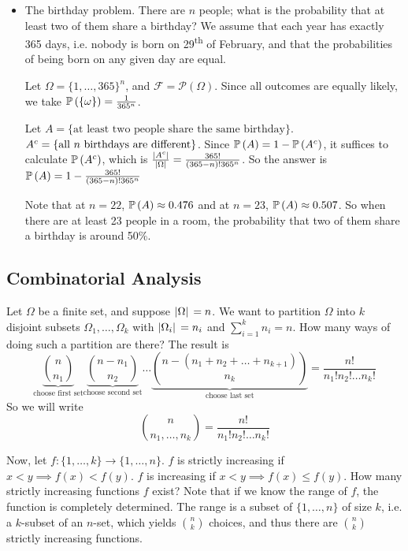 \documentclass{article}
\begin{document}
\begin{itemize}
    \item The birthday problem. There are $n$ people; what is the probability that at least two of them share a birthday? We assume that each year has exactly 365 days, i.e. nobody is born on 29\textsuperscript{th} of February, and that the probabilities of being born on any given day are equal.

          Let $\Omega = \{1, \dots, 365\}^n$, and $\mathcal F = \mathcal P(\Omega)$. Since all outcomes are equally likely, we take $\mathbb{P}\left({\{\omega\}}\right) = \frac{1}{365^n}$.

          Let $A = \{ \text{at least two people share the same birthday} \}$. ${A}^c = \{ \text{all } n \text{ birthdays are different} \}$. Since $\mathbb{P}\left({A}\right) = 1 - \mathbb{P}\left({{A}^c}\right)$, it suffices to calculate $\mathbb{P}\left({{A}^c}\right)$, which is $\frac{\abs*{{A}^c}}{\abs*{\Omega}} = \frac{365!}{(365 - n)!365^n}$. So the answer is $\mathbb{P}\left({A}\right) = 1 - \frac{365!}{(365 - n)!365^n}$

          Note that at $n=22$, $\mathbb{P}\left({A}\right) \approx 0.476$ and at $n=23$, $\mathbb{P}\left({A}\right) \approx 0.507$. So when there are at least 23 people in a room, the probability that two of them share a birthday is around 50\%.
\end{itemize}

\subsection{Combinatorial Analysis}
Let $\Omega$ be a finite set, and suppose $\abs*{\Omega} = n$. We want to partition $\Omega$ into $k$ disjoint subsets $\Omega_1, \dots, \Omega_k$ with $\abs*{\Omega_i} = n_i$ and $\sum_{i=1}^k n_i = n$. How many ways of doing such a partition are there? The result is
\[ \underbrace{\binom{n}{n_1}}_{\text{choose first set}}\underbrace{\binom{n-n_1}{n_2}}_{\text{choose second set}}\dots\underbrace{\binom{n-(n_1 + n_2 + \dots + n_{k+1})}{n_k}}_{\text{choose last set}} = \frac{n!}{n_1!n_2!\dots n_k!} \]
So we will write
\[ \binom{n}{n_1, \dots, n_k} = \frac{n!}{n_1!n_2!\dots n_k!} \]

Now, let $f\colon \{1, \dots, k\} \to \{1, \dots, n\}$. $f$ is strictly increasing if $x < y \implies f(x) < f(y)$. $f$ is increasing if $x < y \implies f(x) \leq f(y)$. How many strictly increasing functions $f$ exist? Note that if we know the range of $f$, the function is completely determined. The range is a subset of $\{1, \dots, n\}$ of size $k$, i.e. a $k$-subset of an $n$-set, which yields $\binom{n}{k}$ choices, and thus there are $\binom{n}{k}$ strictly increasing functions.
\end{document}
